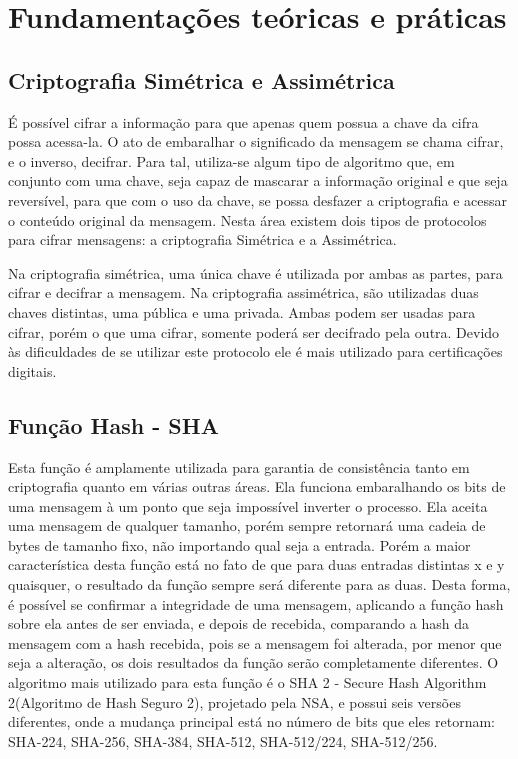 \documentclass[11pt]{article}
\begin{document}
	\section {Fundamentações teóricas e práticas}
		\subsection{Criptografia Simétrica e Assimétrica}
			
			

	 		É possível cifrar a informação para que apenas quem possua a chave da cifra possa acessa-la. O ato de embaralhar o significado da mensagem se chama cifrar, e o inverso, decifrar. Para tal, utiliza-se algum tipo de algoritmo que, em conjunto com uma chave, seja capaz de mascarar a informação original e que seja reversível, para que com o uso da chave, se possa desfazer a criptografia e acessar o conteúdo original da mensagem. Nesta área existem dois tipos de protocolos para cifrar mensagens: a criptografia Simétrica e a Assimétrica.
	 			
			Na criptografia simétrica, uma única chave é utilizada por ambas as partes, para cifrar e decifrar a mensagem. Na criptografia assimétrica, são utilizadas duas chaves distintas, uma pública e uma privada. Ambas podem ser usadas para cifrar, porém o que uma cifrar, somente poderá ser decifrado pela outra. Devido às dificuldades de se utilizar este protocolo ele é mais utilizado para certificações digitais.
					
			

		\subsection{Função Hash - SHA}
			
			

			 Esta função é amplamente utilizada para garantia de consistência tanto em criptografia quanto em várias outras áreas. Ela funciona embaralhando os bits de uma mensagem à um ponto que seja impossível inverter o processo. Ela aceita uma mensagem de qualquer tamanho, porém sempre retornará uma cadeia de bytes de tamanho fixo, não importando qual seja a entrada. Porém a maior característica desta função está no fato de que para duas entradas distintas x e y quaisquer, o resultado da função sempre será diferente para as duas. Desta forma, é possível se confirmar a integridade de uma mensagem, aplicando a função hash sobre ela antes de ser enviada, e depois de recebida, comparando a hash da mensagem com a hash recebida, pois se a mensagem foi alterada, por menor que seja a alteração, os dois resultados da função serão completamente diferentes. O algoritmo mais utilizado para esta função é o SHA 2 - Secure Hash Algorithm 2(Algoritmo de Hash Seguro 2), projetado pela NSA, e possui seis versões diferentes, onde a mudança principal está no número de bits que eles retornam: SHA-224, SHA-256, SHA-384, SHA-512, SHA-512/224, SHA-512/256. 
			
\end{document}
